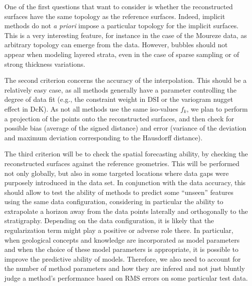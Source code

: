 \documentclass[final]{ring20}
\begin{document}
{%

One of the first questions that want to consider is whether the reconstructed surfaces have the same topology as the reference surfaces. Indeed, implicit methods do not \textit{a priori} impose a particular topology for the implicit surfaces. This is a very interesting feature, for instance in the case of the Moureze data, as arbitrary topology can emerge from the data. However, bubbles should not appear when modeling layered strata, even in the case of sparse sampling or of strong thickness variations. 


The second criterion concerns the accuracy of the interpolation. This should be a relatively easy case, as all methods generally have a parameter controlling the degree of data fit (e.g., the constraint weight in DSI or the variogram nugget effect in DcK). As not all methods use the same iso-values $f_k$, we plan to perform a projection of the points onto the reconstructed surfaces, and then check for possible bias (average of the signed distance) and error (variance of the deviation and maximum deviation corresponding to the Hausdorff distance). 

The third criterion will be to check the spatial forecasting ability, by checking the reconstructed surfaces against the reference geometries. This will be performed not only globally, but also in some targeted locations where data gaps were purposely introduced in the data set. In conjunction with the data accuracy, this should allow to test the ability of methods to predict some ``unseen'' features using the same data configuration, considering in particular the ability to extrapolate a horizon away from the data points laterally and orthogonally to the stratigraphy. Depending on the data configuration, it is likely that the regularization term might play a positive or adverse role there. In particular, when geological concepts and knowledge are incorporated as model parameters \citep[e.g.,][]{Laurent2016EaPSL,Grose2017JSG,Grose2018JGRSE,Grose2019JoSG} and when the choice of these model parameters is appropriate, it is possible to improve the predictive ability of models. Therefore, we also need to account for the number of method parameters and how they are infered and not just bluntly judge a method's performance based on RMS errors on some particular test data.  

}
\end{document}
